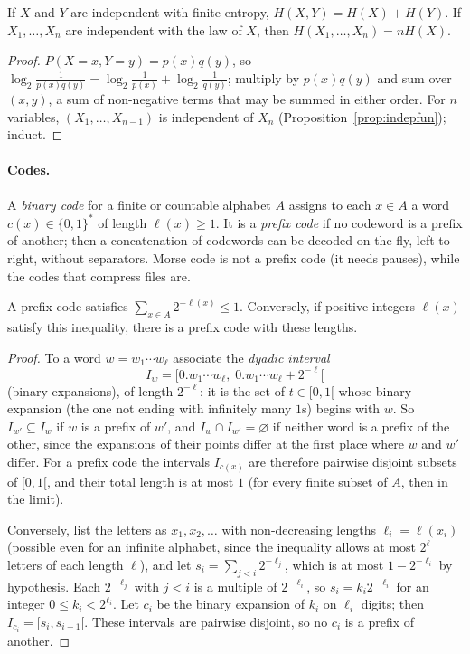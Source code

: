 \begin{proposition}\label{prop:entropyadd}
If $X$ and $Y$ are independent with finite entropy, $H(X,Y)=H(X)+H(Y)$. If $X_1,\dots,X_n$ are independent with the law
of $X$, then $H(X_1,\dots,X_n)=nH(X)$.
\end{proposition}
\begin{proof}
$P(X=x,Y=y)=p(x)q(y)$, so $\log_2\frac1{p(x)q(y)}=\log_2\frac1{p(x)}+\log_2\frac1{q(y)}$; multiply by $p(x)q(y)$ and sum over $(x,y)$, a sum of
non-negative terms that may be summed in either order. For $n$ variables, $(X_1,\dots,X_{n-1})$ is independent of $X_n$
(Proposition~\ref{prop:indepfun}); induct.
\end{proof}

\paragraph{Codes.} A \emph{binary code} for a finite or countable alphabet $A$ assigns to each $x\in A$ a word $c(x)\in\{0,1\}^*$ of
length $\ell(x)\ge1$. It is a \emph{prefix code} if no codeword is a prefix of another; then a concatenation of codewords can be
decoded on the fly, left to right, without separators. Morse code is not a prefix code (it needs pauses), while the
codes that compress files are.

\begin{proposition}\label{prop:kraft}
A prefix code satisfies $\sum_{x\in A}2^{-\ell(x)}\le1$. Conversely, if positive integers $\ell(x)$ satisfy this inequality, there is a
prefix code with these lengths.
\end{proposition}
\begin{proof}
To a word $w=w_1\cdots w_\ell$ associate the \emph{dyadic interval}
\[
I_w=[0.w_1\cdots w_\ell,\;0.w_1\cdots w_\ell+2^{-\ell}[
\]
(binary expansions), of length $2^{-\ell}$: it is the set of $t\in[0,1[$ whose binary expansion (the one not ending with infinitely many $1$s) begins with $w$.
So $I_{w'}\subseteq I_w$ if $w$ is a prefix of $w'$, and $I_w\cap I_{w'}=\varnothing$ if neither word is a prefix of the other, since the
expansions of their points differ at the first place where $w$ and $w'$ differ. For a prefix code the intervals $I_{c(x)}$ are
therefore pairwise disjoint subsets of $[0,1[$, and their total length is at most $1$ (for every finite subset of $A$, then in
the limit).

Conversely, list the letters as $x_1,x_2,\ldots$ with non-decreasing lengths $\ell_i=\ell(x_i)$ (possible even for an infinite alphabet, since the
inequality allows at most $2^\ell$ letters of each length $\ell$), and let $s_i=\sum_{j<i}2^{-\ell_j}$, which is at most $1-2^{-\ell_i}$ by hypothesis. Each $2^{-\ell_j}$ with $j<i$ is a multiple of $2^{-\ell_i}$, so $s_i=k_i2^{-\ell_i}$ for an integer
$0\le k_i<2^{\ell_i}$. Let $c_i$ be the binary expansion of $k_i$ on $\ell_i$ digits; then $I_{c_i}=[s_i,s_{i+1}[$. These intervals are pairwise disjoint,
so no $c_i$ is a prefix of another.
\end{proof}

